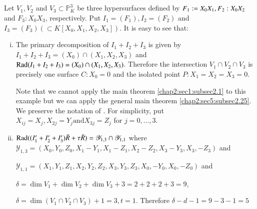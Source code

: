 \setcounter{subsection}{12}
\subsection{} \label{chap3:sec1:subsec3.13}
Let $V_1, V_2$ and $V_3 \subset \mathbb{P}^3_K$ be three
hypersurfaces defined by $F_1: = X_0X_1,\break F_2:  X_0 X_2$ and  $F_3:
X_0X_3$, respectively. Put $I_1 = (F_1), I_2 = (F_2)$ and $I_3 =
(F_3) (\subset K[X_0, X_1,X_2,X_3])$. It is easy to see that: 

\begin{enumerate}[(i)] 
\item 
  The primary decomposition of $I_1 + I_2 + I_3$ is given by $I_1 +
  I_2 + I_3 = (X_0) \cap (X_1,X_2,X_3)$ and $\operatorname{Rad} (I_1 + I_2 + I_3) = (X_0)
  \cap (X_1,X_2,X_3)$. Therefore the intersection $V_1 \cap V_2 \cap
  V_3$ is precisely one surface $C: X_0 = 0$  and the isolated point
  $P:  X_1 = X_2 = X_3 = 0$. 

  Note that we cannot apply the main theorem
  \ref{chap2:sec1:subsec2.1} to this example but 
  we can apply the general main theorem
  \ref{chap2:sec5:subsec2.25}. We preserve the 
  notation of \cite{56}. For simplicity, put $X_{ij} = X_j, X_{2j} = Y_j
  \text{and} X_{3j} = Z_j$ for $j = 0,\ldots,3$.   
\item  $\operatorname{Rad} ((I'_1 + I'_2 +I'_3) \bar{R} +\tau \bar{R}) =\mathscr{Y}_{1,3}
  \cap \mathscr{Y}_{1,1}$ where $\mathscr{Y}_{1,3} = (X_0, Y_0,Z_0,X_1-Y_1,X_1
  -Z_1,X_2-Z_2,X_3-Y_3,X_3,-Z_3)$ and   

  $\mathscr{Y}_{1,1} = (X_1,
  Y_1,Z_1,X_2,Y_2,Z_2,X_3,Y_3,Z_3,X_0,-Y_0,X_0,-Z_0)$ and 
 
  $\delta =\dim V_1 + \dim V_2 + \dim V_3 + 3 =2 + 2 +2 +3 = 9$,
   
  $\delta= \dim (V_1 \cap V_2 \cap V_3)+1 = 3, t=1$. Therefore
  $\delta-d-1 =9 -3-1=5$  
    

\end{enumerate}
